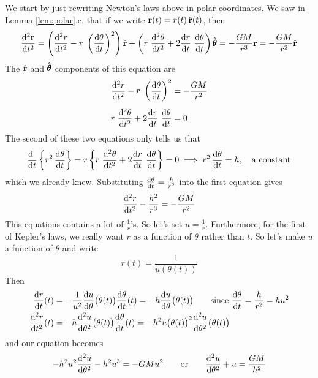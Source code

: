 We start by just rewriting Newton's laws above in polar coordinates.
We saw in Lemma \ref{lem:polar}.c, that if we write $\mathbf{r}(t) = r(t)\,\hat{\mathbf{r}}(t)$,
then 
\begin{align*}
\difftwo{\vr}{t} = 
  \left(\difftwo{r}{t}-r\ \left(\diff{\theta}{t}\right)^2\right) \hat\vr
  +\left(r\ \difftwo{\theta}{t} + 2 \diff{r}{t}\ \diff{\theta}{t}\right)\hat\vth
= -\frac{GM}{r^3}\vr
= -\frac{GM}{r^2}\hat\vr
\end{align*}
The $\hat{\mathbf{r}}$ and $\hat{{\pmb{\theta}}}$ components of this equation are
\begin{align*}
\difftwo{r}{t}-r\ \left(\diff{\theta}{t}\right)^2 &= -\frac{GM}{r^2} \\[0.05in]
r\ \difftwo{\theta}{t} + 2 \diff{r}{t}\ \diff{\theta}{t} &= 0
\end{align*}
The second of these two equations only tells us that
\begin{equation*}
\diff{\ }{t}\left\{r^2\,\diff{\theta}{t}\right\} 
= r\left\{
     r\ \difftwo{\theta}{t} + 2 \diff{r}{t}\ \diff{\theta}{t}\right\} = 0
\implies 
r^2\,\diff{\theta}{t} = h,\quad\text{a constant}
\end{equation*}
which we already knew. Substituting $\diff{\theta}{t} =\frac{h}{r^2}$
into the first equation gives
\begin{equation}\label{eqn:planetRadialR}
\difftwo{r}{t}-\frac{h^2}{r^3} = -\frac{GM}{r^2} 
\end{equation}
This equations contains a lot of $\frac{1}{r}$'s. So let's set $u=\frac{1}{r}$.
Furthermore, for the first of Kepler's laws, we really want $r$ as a function of
$\theta$ rather than $t$. So let's make $u$ a function of $\theta$ and write
\begin{equation*}
r(t) = \frac{1}{u(\theta(t))}
\end{equation*}
Then
\begin{align*}
\diff{r}{t}(t) &= -\frac{1}{u^2}
        \diff{u}{\theta}\big(\theta(t)\big)\diff{\theta}{t}(t)
   = - h\diff{u}{\theta}\big(\theta(t)\big)\qquad
\text{since $\diff{\theta}{t} = \frac{h}{r^2}=hu^2$} \\
\difftwo{r}{t}(t) 
   &= -h\difftwo{u}{\theta}\big(\theta(t)\big)\diff{\theta}{t}(t)
     = -h^2 u\big(\theta(t)\big)^2 \difftwo{u}{\theta}\big(\theta(t)\big)
\end{align*}
and our equation becomes
\begin{equation}\label{eqn:planetRadialU}
-h^2u^2\difftwo{u}{\theta} -h^2u^3= -GM u^2\qquad\text{or}\qquad
\difftwo{u}{\theta} + u = \frac{GM}{h^2}
\end{equation}
